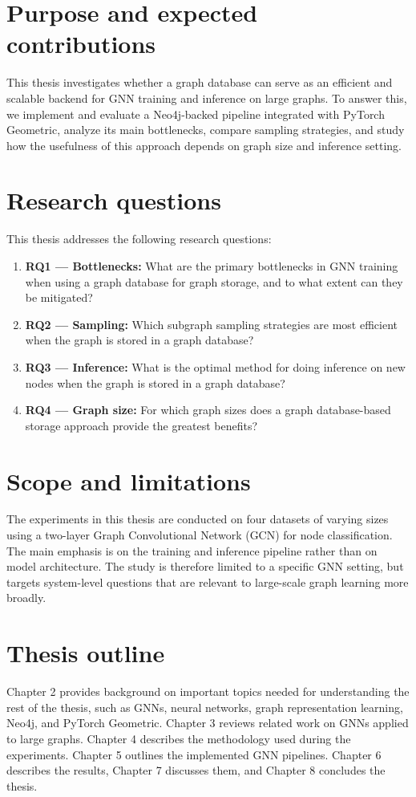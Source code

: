 \documentclass[PhD]{uclathes}
\begin{document}
\section{Purpose and expected contributions}
This thesis investigates whether a graph database can serve as an efficient and
scalable backend for GNN training and inference on large graphs. To answer this,
we implement and evaluate a Neo4j-backed pipeline integrated with PyTorch
Geometric, analyze its main bottlenecks, compare sampling strategies, and study
how the usefulness of this approach depends on graph size and inference setting.

\section{Research questions}
This thesis addresses the following research questions:

\begin{enumerate}
    \item \textbf{RQ1 --- Bottlenecks:}\label{question:bottleneck} What are the primary bottlenecks in GNN training when using a graph database for graph storage, and to what extent can they be mitigated?
    \item \textbf{RQ2 --- Sampling:}\label{question:sampling} Which subgraph sampling strategies are most efficient when the graph is stored in a graph database?
    \item \textbf{RQ3 --- Inference:}\label{question:inference} What is the optimal method for doing inference on new nodes when the graph is stored in a graph database?
    \item \textbf{RQ4 --- Graph size:}\label{question:graphsize} For which graph sizes does a graph database-based storage approach provide the greatest benefits?
\end{enumerate}

\section{Scope and limitations}
The experiments in this thesis are conducted on four datasets of varying sizes
using a two-layer Graph Convolutional Network (GCN) for node classification.
The main emphasis is on the training and inference pipeline rather than on model
architecture. The study is therefore limited to a specific GNN setting, but
targets system-level questions that are relevant to large-scale graph learning
more broadly.

\section{Thesis outline}
Chapter 2 provides background on important topics needed for understanding the
rest of the thesis, such as GNNs, neural networks, graph representation
learning, Neo4j, and PyTorch Geometric. Chapter 3 reviews related work on GNNs
applied to large graphs. Chapter 4 describes the methodology used during the
experiments. Chapter 5 outlines the implemented GNN pipelines. Chapter 6
describes the results, Chapter 7 discusses them, and Chapter 8 concludes the
thesis.
\end{document}
